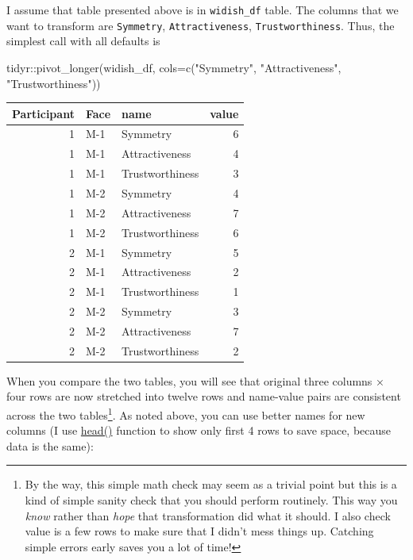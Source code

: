 \documentclass[
]{book}
\newenvironment{Shaded}{\begin{snugshade}}{\end{snugshade}}
\newcommand{\AttributeTok}[1]{\textcolor[rgb]{0.77,0.63,0.00}{#1}}
\newcommand{\FunctionTok}[1]{\textcolor[rgb]{0.00,0.00,0.00}{#1}}
\newcommand{\NormalTok}[1]{#1}
\newcommand{\SpecialCharTok}[1]{\textcolor[rgb]{0.00,0.00,0.00}{#1}}
\newcommand{\StringTok}[1]{\textcolor[rgb]{0.31,0.60,0.02}{#1}}
\begin{document}
I assume that table presented above is in \texttt{widish\_df} table. The columns that we want to transform are \texttt{Symmetry}, \texttt{Attractiveness}, \texttt{Trustworthiness}. Thus, the simplest call with all defaults is

\begin{Shaded}
\begin{Highlighting}[]
\NormalTok{tidyr}\SpecialCharTok{::}\FunctionTok{pivot\_longer}\NormalTok{(widish\_df, }
                    \AttributeTok{cols=}\FunctionTok{c}\NormalTok{(}\StringTok{"Symmetry"}\NormalTok{, }\StringTok{"Attractiveness"}\NormalTok{, }\StringTok{"Trustworthiness"}\NormalTok{))}
\end{Highlighting}
\end{Shaded}

\begin{tabular}{r|l|l|r}
\hline
Participant & Face & name & value\\
\hline
1 & M-1 & Symmetry & 6\\
\hline
1 & M-1 & Attractiveness & 4\\
\hline
1 & M-1 & Trustworthiness & 3\\
\hline
1 & M-2 & Symmetry & 4\\
\hline
1 & M-2 & Attractiveness & 7\\
\hline
1 & M-2 & Trustworthiness & 6\\
\hline
2 & M-1 & Symmetry & 5\\
\hline
2 & M-1 & Attractiveness & 2\\
\hline
2 & M-1 & Trustworthiness & 1\\
\hline
2 & M-2 & Symmetry & 3\\
\hline
2 & M-2 & Attractiveness & 7\\
\hline
2 & M-2 & Trustworthiness & 2\\
\hline
\end{tabular}

When you compare the two tables, you will see that original three columns × four rows are now stretched into twelve rows and name-value pairs are consistent across the two tables\footnote{By the way, this simple math check may seem as a trivial point but this is a kind of simple sanity check that you should perform routinely. This way you \emph{know} rather than \emph{hope} that transformation did what it should. I also check value is a few rows to make sure that I didn't mess things up. Catching simple errors early saves you a lot of time!}. As noted above, you can use better names for new columns (I use \href{https://stat.ethz.ch/R-manual/R-devel/library/utils/html/head.html}{head()} function to show only first 4 rows to save space, because data is the same):
\end{document}
